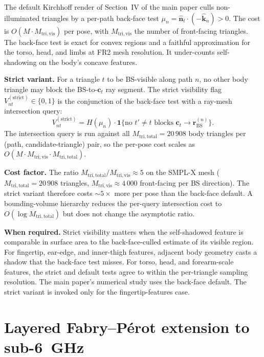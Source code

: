 \documentclass[10pt,journal,twocolumn]{IEEEtran}
\newcommand{\nhat}{\hat{\bm{n}}}
\newcommand{\khat}{\hat{\bm{k}}}
\theoremstyle{plain}
\theoremstyle{definition}
\begin{document}
The default Kirchhoff render of Section~IV of the main paper culls
non-illuminated triangles by a per-path back-face test
$\mu_n = \nhat_t \cdot (-\khat_n) > 0$. The cost is
$O(M \cdot M_\mathrm{tri,vis})$ per pose, with $M_\mathrm{tri,vis}$
the number of front-facing triangles. The back-face test is exact
for convex regions and a faithful approximation for the torso, head,
and limbs at FR2 mesh resolution. It under-counts self-shadowing on
the body's concave features.

\textbf{Strict variant.} For a triangle $t$ to be BS-visible along
path $n$, no other body triangle may block the BS-to-$\bm{c}_t$ ray
segment. The strict visibility flag
$V^{(\mathrm{strict})}_{nt} \in \{0, 1\}$ is the conjunction of the
back-face test with a ray-mesh intersection query:
\begin{equation}\label{eq:V-strict}
  V^{(\mathrm{strict})}_{nt} = H(\mu_n) \cdot
    \mathbf{1}\bigl\{\text{no $t' \neq t$ blocks
      $\bm{c}_t \to \bm{r}_\mathrm{BS}^{(n)}$}\bigr\}.
\end{equation}
The intersection query is run against all $M_\mathrm{tri,total} =
20\,908$ body triangles per (path, candidate-triangle) pair, so the
per-pose cost scales as
$O(M \cdot M_\mathrm{tri,vis} \cdot M_\mathrm{tri,total})$.

\textbf{Cost factor.} The ratio
$M_\mathrm{tri,total} / M_\mathrm{tri,vis} \approx 5$ on the SMPL-X
mesh ($M_\mathrm{tri,total} = 20\,908$ triangles,
$M_\mathrm{tri,vis} \approx 4\,000$ front-facing per BS direction).
The strict variant therefore costs ${\sim}5{\times}$ more per pose
than the back-face default. A bounding-volume hierarchy reduces the
per-query intersection cost to $O(\log M_\mathrm{tri,total})$ but
does not change the asymptotic ratio.

\textbf{When required.} Strict visibility matters when the
self-shadowed feature is comparable in surface area to the
back-face-culled estimate of its visible region. For fingertip,
ear-edge, and inner-thigh features, adjacent body geometry casts a
shadow that the back-face test misses. For torso, head, and
forearm-scale features, the strict and default tests agree to within
the per-triangle sampling resolution. The main paper's numerical
study uses the back-face default. The strict variant is invoked
only for the fingertip-features case.

\section{Layered Fabry--P\'{e}rot extension to sub-6~GHz}\label{si:fp}
\end{document}
